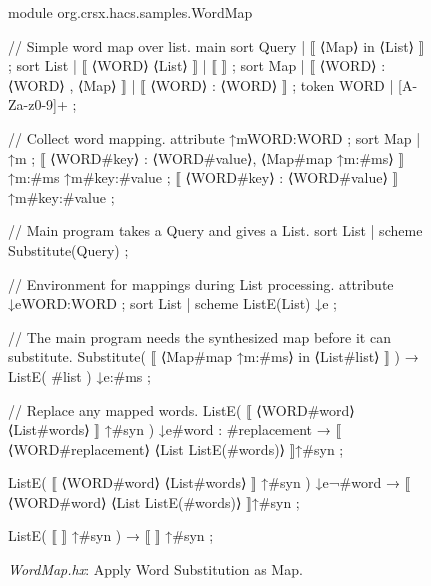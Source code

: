 \documentclass[11pt]{article} %
\begin{document}
\begin{figure}[p]
\begin{hacs}[numbers=right,texcl]
module org.crsx.hacs.samples.WordMap {

// Simple word map over list.
main sort Query | ⟦ ⟨Map⟩ in ⟨List⟩ ⟧ ;
sort List | ⟦ ⟨WORD⟩ ⟨List⟩ ⟧ | ⟦ ⟧ ;
sort Map | ⟦ ⟨WORD⟩ : ⟨WORD⟩ , ⟨Map⟩ ⟧ | ⟦ ⟨WORD⟩ : ⟨WORD⟩ ⟧ ;
token WORD | [A-Za-z0-9]+ ;

// Collect word mapping.
attribute ↑m{WORD:WORD} ;
sort Map | ↑m ;
⟦ ⟨WORD#key⟩ : ⟨WORD#value⟩, ⟨Map#map ↑m{:#ms}⟩ ⟧ ↑m{:#ms} ↑m{#key:#value} ;
⟦ ⟨WORD#key⟩ : ⟨WORD#value⟩ ⟧ ↑m{#key:#value} ;

// Main program takes a Query and gives a List.
sort List | scheme Substitute(Query) ;

// Environment for mappings during List processing.
attribute ↓e{WORD:WORD} ;
sort List | scheme ListE(List) ↓e ;

// The main program needs the synthesized map before it can substitute.
Substitute( ⟦ ⟨Map#map ↑m{:#ms}⟩ in ⟨List#list⟩ ⟧ ) → ListE( #list ) ↓e{:#ms} ;

// Replace any mapped words.
ListE( ⟦ ⟨WORD#word⟩ ⟨List#words⟩ ⟧ ↑#syn ) ↓e{#word : #replacement}
→ 
⟦ ⟨WORD#replacement⟩ ⟨List ListE(#words)⟩ ⟧↑#syn
;

ListE( ⟦ ⟨WORD#word⟩ ⟨List#words⟩ ⟧ ↑#syn ) ↓e{¬#word}
→ 
⟦ ⟨WORD#word⟩ ⟨List ListE(#words)⟩ ⟧↑#syn
;

ListE( ⟦ ⟧ ↑#syn ) → ⟦ ⟧ ↑#syn ;
}
\end{hacs}
\caption{\emph{WordMap.hx}: Apply Word Substitution as Map.}
\label{fig:wordmap}
\end{figure}
\end{document}
